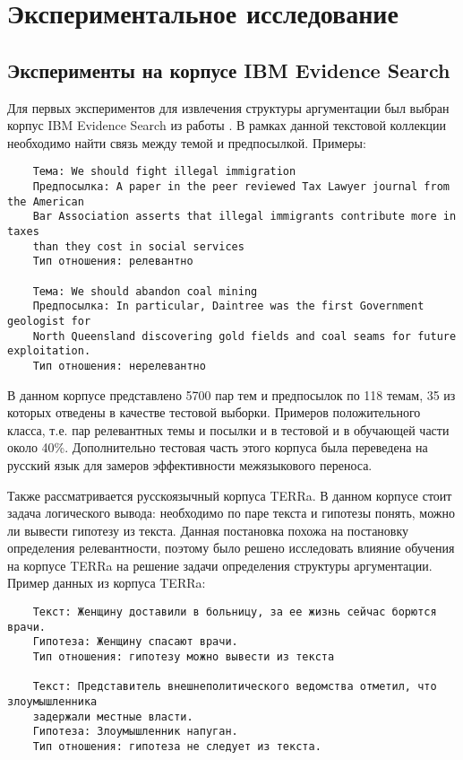 \section{Экспериментальное исследование}

\subsection{Эксперименты на корпусе IBM Evidence Search}

Для первых экспериментов для извлечения структуры аргументации был выбран корпус IBM Evidence Search из работы \cite{shnarch2018will}. В рамках данной текстовой коллекции необходимо найти связь между темой и предпосылкой. Примеры:

\begin{verbatim}
    Тема: We should fight illegal immigration
    Предпосылка: A paper in the peer reviewed Tax Lawyer journal from the American 
    Bar Association asserts that illegal immigrants contribute more in taxes 
    than they cost in social services
    Тип отношения: релевантно
    
    Тема: We should abandon coal mining
    Предпосылка: In particular, Daintree was the first Government geologist for
    North Queensland discovering gold fields and coal seams for future exploitation.
    Тип отношения: нерелевантно
\end{verbatim}

В данном корпусе представлено 5700 пар тем и предпосылок по 118 темам, 35 из которых отведены в качестве тестовой выборки. Примеров положительного класса, т.е. пар релевантных темы и посылки и в тестовой и в обучающей части около 40\%. Дополнительно тестовая часть этого корпуса была переведена на русский язык для замеров эффективности межязыкового переноса.

Также рассматривается русскоязычный корпуса TERRa. В данном корпусе стоит задача логического вывода: необходимо по паре текста и гипотезы понять, можно ли вывести гипотезу из текста. Данная постановка похожа на постановку определения релевантности, поэтому было решено исследовать влияние обучения на корпусе TERRa на решение задачи определения структуры аргументации. Пример данных из корпуса TERRa:
\begin{verbatim}
    Текст: Женщину доставили в больницу, за ее жизнь сейчас борются врачи.
    Гипотеза: Женщину спасают врачи.
    Тип отношения: гипотезу можно вывести из текста
    
    Текст: Представитель внешнеполитического ведомства отметил, что злоумышленника
    задержали местные власти.
    Гипотеза: Злоумышленник напуган.
    Тип отношения: гипотеза не следует из текста.
\end{verbatim}

